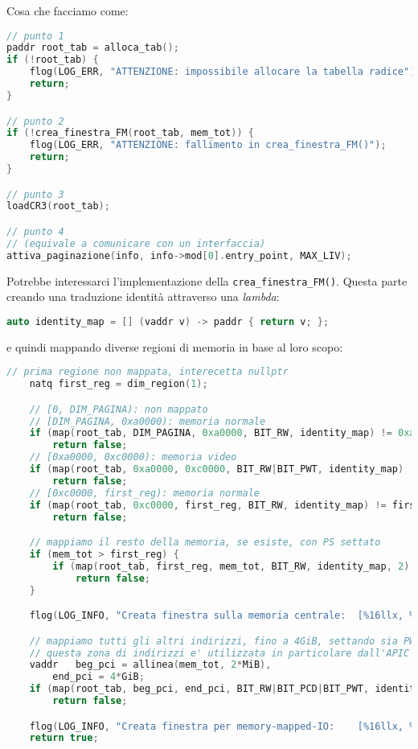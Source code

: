\documentclass[a4paper,11pt]{article}
\begin{document}
Cosa che facciamo come:
\begin{lstlisting}[language=C++, style=codestyle]	
// punto 1
paddr root_tab = alloca_tab();
if (!root_tab) {
	flog(LOG_ERR, "ATTENZIONE: impossibile allocare la tabella radice");
	return;
}

// punto 2
if (!crea_finestra_FM(root_tab, mem_tot)) {
	flog(LOG_ERR, "ATTENZIONE: fallimento in crea_finestra_FM()");
	return;
}

// punto 3
loadCR3(root_tab);

// punto 4
// (equivale a comunicare con un interfaccia)
attiva_paginazione(info, info->mod[0].entry_point, MAX_LIV);  
\end{lstlisting}

Potrebbe interessarci l'implementazione della \lstinline|crea_finestra_FM()|.
Questa parte creando una traduzione identità attraverso una \textit{lambda}:
\begin{lstlisting}[language=C++, style=codestyle]	
auto identity_map = [] (vaddr v) -> paddr { return v; };
\end{lstlisting}
e quindi mappando diverse regioni di memoria in base al loro scopo:
\begin{lstlisting}[language=C++, style=codestyle]	
	// prima regione non mappata, interecetta nullptr
	natq first_reg = dim_region(1);

	// [0, DIM_PAGINA): non mappato
	// [DIM_PAGINA, 0xa0000): memoria normale
	if (map(root_tab, DIM_PAGINA, 0xa0000, BIT_RW, identity_map) != 0xa0000)
		return false;
	// [0xa0000, 0xc0000): memoria video
	if (map(root_tab, 0xa0000, 0xc0000, BIT_RW|BIT_PWT, identity_map) != 0xc0000)
		return false;
	// [0xc0000, first_reg): memoria normale
	if (map(root_tab, 0xc0000, first_reg, BIT_RW, identity_map) != first_reg)
		return false;

	// mappiamo il resto della memoria, se esiste, con PS settato
	if (mem_tot > first_reg) {
		if (map(root_tab, first_reg, mem_tot, BIT_RW, identity_map, 2) != mem_tot)
			return false;
	}

	flog(LOG_INFO, "Creata finestra sulla memoria centrale:  [%16llx, %16llx)", DIM_PAGINA, mem_tot);

	// mappiamo tutti gli altri indirizzi, fino a 4GiB, settando sia PWT che PCD.
	// questa zona di indirizzi e' utilizzata in particolare dall'APIC per mappare i propri registri.
	vaddr	beg_pci = allinea(mem_tot, 2*MiB),
		end_pci = 4*GiB;
	if (map(root_tab, beg_pci, end_pci, BIT_RW|BIT_PCD|BIT_PWT, identity_map, 2) != end_pci)
		return false;

	flog(LOG_INFO, "Creata finestra per memory-mapped-IO:    [%16llx, %16llx)", beg_pci, end_pci);
	return true;
\end{lstlisting}
\end{document}
